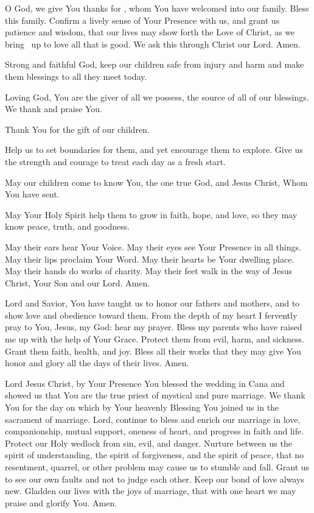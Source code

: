O God, we give You thanks for \insertname, whom You have welcomed into our family.
Bless this family.
Confirm a lively sense of Your Presence with us, and grant us patience and wisdom, that our lives may show forth the Love of Christ, as we bring \insertname\ up to love all that is good.
We ask this through Christ our Lord.
Amen.

\label{prayer:safety_children}
Strong and faithful God, keep our children safe from injury and harm and make them blessings to all they meet today.

\label{prayer:parent}
Loving God, You are the giver of all we possess, the source of all of our blessings.
We thank and praise You.

Thank You for the gift of our children.

Help us to set boundaries for them, and yet encourage them to explore.
Give us the strength and courage to treat each day as a fresh start.

May our children come to know You, the one true God, and Jesus Christ, Whom You have sent.

May Your Holy Spirit help them to grow in faith, hope, and love, so they may know peace, truth, and goodness.

May their ears hear Your Voice.
May their eyes see Your Presence in all things.
May their lips proclaim Your Word.
May their hearts be Your dwelling place.
May their hands do works of charity.
May their feet walk in the way of Jesus Christ, Your Son and our Lord.
Amen.

Lord and Savior, You have taught us to honor our fathers and mothers, and to show love and obedience toward them.
From the depth of my heart I fervently pray to You, Jesus, my God: hear my prayer.
Bless my parents who have raised me up with the help of Your Grace.
Protect them from evil, harm, and sickness.
Grant them faith, health, and joy.
Bless all their works that they may give You honor and glory all the days of their lives.
Amen.

Lord Jesus Christ, by Your Presence You blessed the wedding in Cana and showed us that You are the true priest of mystical and pure marriage.
We thank You for the day on which by Your heavenly Blessing You joined us in the sacrament of marriage.
Lord, continue to bless and enrich our marriage in love, companionship, mutual support, oneness of heart, and progress in faith and life.
Protect our Holy wedlock from sin, evil, and danger.
Nurture between us the spirit of understanding, the spirit of forgiveness, and the spirit of peace, that no resentment, quarrel, or other problem may cause us to stumble and fall.
Grant us to see our own faults and not to judge each other.
Keep our bond of love always new.
Gladden our lives with the joys of marriage, that with one heart we may praise and glorify You.
Amen.

